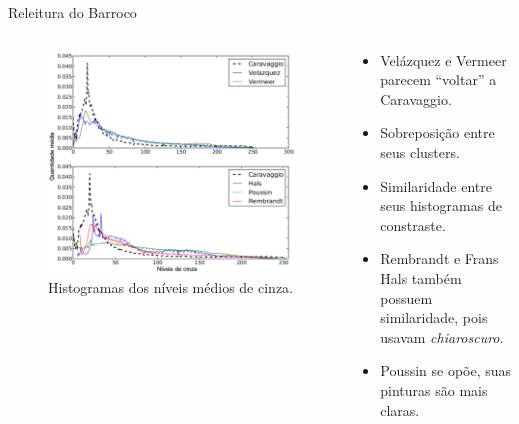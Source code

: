 \documentclass{beamer}
\begin{document}
\begin{frame}{Releitura do Barroco}
\begin{columns}
\begin{column}{.49\textwidth}
{\begin{figure}[h!]
\begin{center}
    \includegraphics[width=1.1\columnwidth]{figs/chiaroscuro2}
    \caption{Histogramas dos níveis médios de cinza.}
\end{center}
\end{figure}
}
 \end{column}

 \begin{column}{.49\textwidth}
  \begin{itemize}
    \item<1> Velázquez e Vermeer parecem ``voltar'' a Caravaggio.

    \item<2> Sobreposição entre seus clusters.

    \item<3> Similaridade entre seus histogramas de constraste. 

    \item<3> Rembrandt e Frans Hals também possuem similaridade, pois usavam \textit{chiaroscuro}.

    \item<3> Poussin se opõe, suas pinturas são mais claras.
    \end{itemize}
 \end{column}
\end{columns}

\end{frame}

\end{document}
